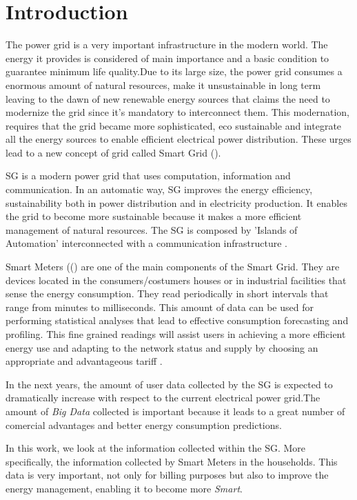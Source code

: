 \chapter{Introduction}\label{c:intro}
The power  grid is a very important infrastructure in the modern world. The energy it provides is considered of main importance and a basic condition to guarantee minimum life quality.Due to its large size, the power grid consumes a enormous amount of natural resources, make it unsustainable in long term leaving to the dawn of new renewable energy sources that claims the need to modernize the grid since it's mandatory to interconnect them. This modernation, requires that the grid became more sophisticated, eco sustainable and integrate all the energy sources to enable efficient electrical power distribution. These urges lead to a new concept of grid called Smart Grid ().

SG is a modern power grid that uses computation, information and communication. In an automatic way, SG improves the energy efficiency, sustainability both in power distribution and in electricity production. It enables the grid to become more sustainable because it makes a more efficient management of  natural resources. The SG is composed by 'Islands of Automation' interconnected with a communication infrastructure \cite{Ericsson_2}. 

Smart Meters (() are one of the main components of the Smart Grid. They are devices located in the consumers/costumers houses or in industrial facilities that sense the energy consumption. They  read periodically in short intervals that range from minutes to milliseconds. This amount of data can be used for performing statistical analyses that lead to effective consumption forecasting and profiling. This fine grained readings will assist users in achieving a more efficient energy use and adapting to the network status and supply by choosing an appropriate and advantageous tariff \cite{journals/spm/ErkinTLP13}.

In the next years, the amount of user data collected by the SG is expected to dramatically increase with respect to the current electrical power grid.The amount of \textit{Big Data} collected is important because it leads to a great number of comercial advantages and better energy consumption predictions\cite{INDIN2013aggregationPerformance}.

In this work, we look at the information collected within the SG. More specifically, the information collected by Smart Meters in the households. This data is very important, not only for billing purposes but also to improve the energy management, enabling it to become more \textit{Smart}.  

